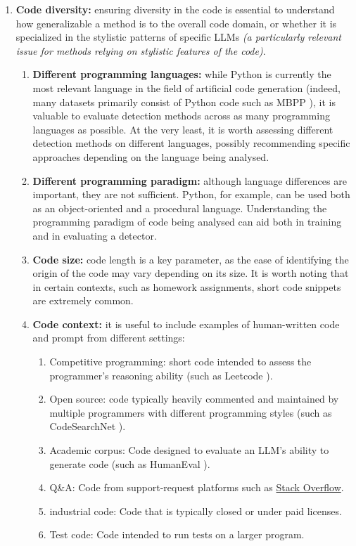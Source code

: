 \begin{enumerate}
    \item \textbf{Code diversity:} 
    ensuring diversity in the code is essential to understand 
    how generalizable a method is to the overall code domain, 
    or whether it is specialized in the stylistic patterns of 
    specific LLMs \textit{(a particularly relevant issue for methods relying 
    on stylistic features of the code)}.
        \begin{enumerate}
        \item \textbf{Different programming languages:}
        while Python is currently the most relevant language 
        in the field of artificial code generation (indeed, many 
        datasets primarily consist of Python code 
        such as MBPP \cite{austin2021program}), 
        it is valuable 
        to evaluate detection methods across as many programming 
        languages as possible. At the very least, it is worth 
        assessing different detection methods on different languages, 
        possibly recommending specific approaches depending 
        on the language being analysed.
        \item \textbf{Different programming paradigm:}
        although language differences are important, 
        they are not sufficient. Python, for example, 
        can be used both as an object-oriented and a procedural 
        language. Understanding the programming paradigm of code being analysed 
        can aid both in training and in evaluating a detector.
        \item \textbf{Code size:}
        code length is a key parameter, as the ease of identifying 
        the origin of the code may vary depending on its size. 
        It is worth noting that in certain contexts, such as homework 
        assignments, short code snippets are extremely common.
        \item \textbf{Code context:}
        it is useful to include examples 
        of human-written code and prompt from different settings: 
        \begin{enumerate}
            \item Competitive programming: short code intended to assess the programmer’s reasoning ability (such as Leetcode \cite{xia2025leetcodedataset}).
            \item Open source: code typically heavily commented and maintained by multiple programmers with different programming styles (such as CodeSearchNet \cite{husain2019codesearchnet}).
            \item Academic corpus: Code designed to evaluate an LLM’s ability to generate code (such as HumanEval \cite{chen2021codex}).
            \item Q\&A: Code from support-request platforms such as \href{https://stackoverflow.com/}{Stack Overflow}.
            \item industrial code: Code that is typically closed or under paid licenses.
            \item Test code: Code intended to run tests on a larger program.
        \end{enumerate}
    \end{enumerate}


\end{enumerate}
